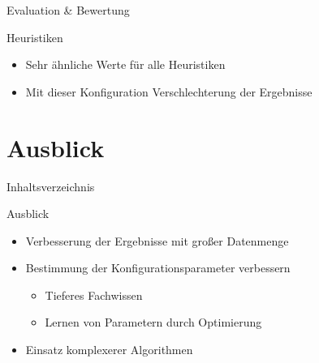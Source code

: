 \begin{frame}{Evaluation \& Bewertung}
\begin{block}{Heuristiken}
\begin{itemize}
	\item Sehr ähnliche Werte für alle Heuristiken
	\item Mit dieser Konfiguration Verschlechterung der Ergebnisse
\end{itemize}
\end{block}
\end{frame}

\section{Ausblick}
\begin{frame}{Inhaltsverzeichnis}
\tableofcontents[currentsection]
\end{frame}

\begin{frame}{Ausblick}
\begin{itemize}
	\item Verbesserung der Ergebnisse mit großer Datenmenge
	\item Bestimmung der Konfigurationsparameter verbessern
	\begin{itemize}
		\item Tieferes Fachwissen
		\item Lernen von Parametern durch Optimierung
	\end{itemize}
	\item Einsatz komplexerer Algorithmen
\end{itemize}
\end{frame}
